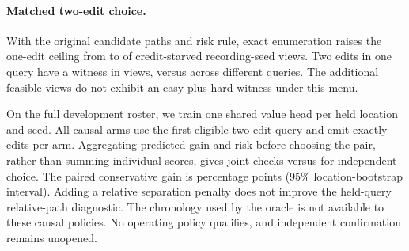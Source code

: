 \paragraph{Matched two-edit choice.}
With the original candidate paths and risk rule, exact enumeration
raises the one-edit ceiling from \TwoEditOne{} to \TwoEditAny{} of
\TwoEditViews{} credit-starved recording-seed views. Two edits in
one query have a witness in \TwoEditSame{} views, versus
\TwoEditCross{} across different queries. The additional feasible
views do not exhibit an easy-plus-hard witness under this menu.

On the full development roster, we train one shared value head per
held location and seed. All causal arms use the first eligible
two-edit query and emit exactly \TwoEditEdits{} edits per arm.
Aggregating predicted gain and risk before choosing the pair, rather
than summing individual scores, gives \TwoEditJoint{} joint checks
versus \TwoEditIndependent{} for independent choice.
The paired conservative gain is \TwoEditGain{} percentage points
(95\% location-bootstrap interval). Adding a relative separation
penalty does not improve the held-query relative-path diagnostic.
The chronology used by the oracle is not available to these causal
policies. No operating policy qualifies, and independent confirmation
remains unopened.
